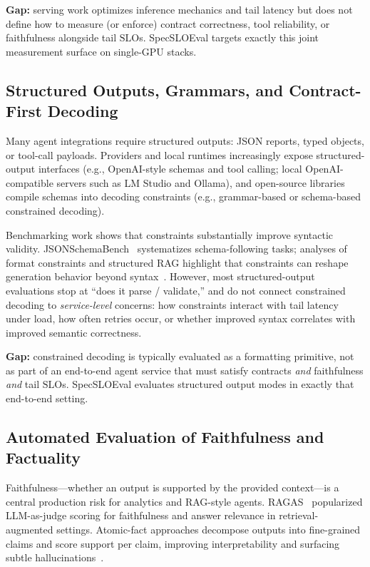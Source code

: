 \documentclass[11pt]{article}
\newcommand{\slo}{\ensuremath{\mathrm{SLO}}}
\begin{document}
\textbf{Gap:} serving work optimizes inference mechanics and tail latency but does not define how to measure (or enforce) contract correctness, tool reliability, or faithfulness alongside tail \slo s.
SpecSLOEval targets exactly this joint measurement surface on single-GPU stacks.

\subsection{Structured Outputs, Grammars, and Contract-First Decoding}

Many agent integrations require structured outputs: JSON reports, typed objects, or tool-call payloads.
Providers and local runtimes increasingly expose structured-output interfaces (e.g., OpenAI-style schemas and tool calling; local OpenAI-compatible servers such as LM Studio and Ollama), and open-source libraries compile schemas into decoding constraints (e.g., grammar-based or schema-based constrained decoding).

Benchmarking work shows that constraints substantially improve syntactic validity.
JSONSchemaBench~\citep{geng2025jsonschemabench} systematizes schema-following tasks; analyses of format constraints and structured RAG highlight that constraints can reshape generation behavior beyond syntax~\citep{letmespeakfreely,openaiStructuredOutputs}.
However, most structured-output evaluations stop at “does it parse / validate,” and do not connect constrained decoding to \emph{service-level} concerns: how constraints interact with tail latency under load, how often retries occur, or whether improved syntax correlates with improved semantic correctness.

\textbf{Gap:} constrained decoding is typically evaluated as a formatting primitive, not as part of an end-to-end agent service that must satisfy contracts \emph{and} faithfulness \emph{and} tail \slo s.
SpecSLOEval evaluates structured output modes in exactly that end-to-end setting.

\subsection{Automated Evaluation of Faithfulness and Factuality}

Faithfulness---whether an output is supported by the provided context---is a central production risk for analytics and RAG-style agents.
RAGAS~\citep{es2023ragas} popularized LLM-as-judge scoring for faithfulness and answer relevance in retrieval-augmented settings.
Atomic-fact approaches decompose outputs into fine-grained claims and score support per claim, improving interpretability and surfacing subtle hallucinations~\citep{atomicFacts2024}.
\end{document}
